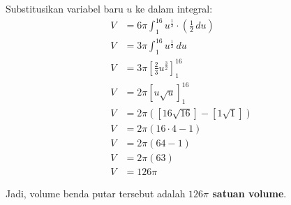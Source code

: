 \documentclass[12pt,a4paper]{article}
\begin{document}
Substitusikan variabel baru $u$ ke dalam integral:
\begin{align*}
  V &= 6\pi \int_{1}^{16} u^{\frac{1}{2}} \cdot \left(\frac{1}{2} \, du\right) \\
  V &= 3\pi \int_{1}^{16} u^{\frac{1}{2}} \, du \\
  V &= 3\pi \left[ \frac{2}{3}u^{\frac{3}{2}} \right]_{1}^{16} \\
  V &= 2\pi \left[ u\sqrt{u} \right]_{1}^{16} \\
  V &= 2\pi \left( \left[ 16\sqrt{16} \right] - \left[ 1\sqrt{1} \right] \right) \\
  V &= 2\pi (16 \cdot 4 - 1) \\
  V &= 2\pi (64 - 1) \\
  V &= 2\pi (63) \\
  V &= 126\pi
\end{align*}

Jadi, volume benda putar tersebut adalah \textbf{$126\pi$ satuan volume}.
\end{document}
